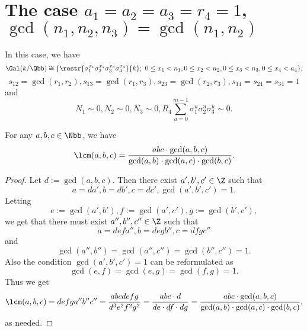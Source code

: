 \section{The case $a_1\!=\!a_2\!=\!a_3\!=\!r_4\!=\!1$, $\gcd(n_1,n_2,n_3)\!=\!\gcd(n_1,n_2)$}
In this case, we have
$$\Gal(k/\Qbb)\cong
 \{\restr{\sigma_1^{x_1}\sigma_2^{x_2}\sigma_3^{x_3}\sigma_4^{x_4}}{k};~  0\leq x_1<n_1, 0\leq x_2<n_2, 0\leq x_3<n_3,0\leq x_4<a_4\},$$
  $$s_{12}=\gcd(r_1,r_2), s_{13}=\gcd(r_1,r_3), s_{23}=\gcd(r_2,r_3), s_{14}=s_{24}=s_{34}=1$$
 and
$$N_1\sim 0, N_2\sim 0, N_3 \sim 0, R_4 \sum_{u=0}^{m-1}\sigma_1^{u}\sigma_2^{u}\sigma_3^{u} \sim 0.$$

\begin{lemma}\label{LCM3}
For any $a,b,c\in\Nbb$, we have $$\lcm(a,b,c)=\frac{abc\cdot \gcd(a,b,c)}{\gcd(a,b)\cdot \gcd(a,c)\cdot\gcd(b,c)}.$$
\end{lemma}
\begin{proof}
Let $d:=\gcd(a,b,c)$. Then there exist $a',b',c'\in\Z$ such that $$a=da', b=db', c=dc',\gcd(a',b',c')=1.$$ Letting $$e:=\gcd(a',b'), f:=\gcd(a',c'), g:=\gcd(b',c'),$$ we get that there must exist $a'',b'',c''\in\Z$ such that $$a=defa'', b=degb'', c=dfgc''$$ and $$\gcd(a'',b'')=\gcd(a'',c'')=\gcd(b'',c'')=1.$$ Also the condition $\gcd(a',b',c')=1$ can be reformulated as  $$\gcd(e,f)=\gcd(e,g)=\gcd(f,g)=1.$$
Thus we get $$\lcm(a,b,c)=defga''b''c''=\frac{abcdefg}{d^3e^2f^2g^2}=\frac{abc\cdot d}{de\cdot df\cdot dg}=\frac{abc\cdot \gcd(a,b,c)}{\gcd(a,b)\cdot \gcd(a,c)\cdot\gcd(b,c)},$$
as needed.
\end{proof}

